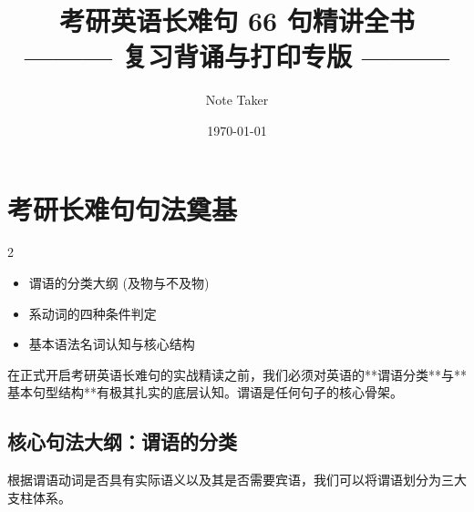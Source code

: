 \documentclass[cn,normal,11pt]{elegantnote}
\title{考研英语长难句 66 句精讲全书\\{\large ——— 复习背诵与打印专版 ———}}
\author{Note Taker}
\institute{一战成硕之句法拆解与核心词汇全攻略}
\date{\today}
\newcommand{\introductionname}{内容概要}
\newenvironment{introduction}[1][\introductionname]{
  \begin{tcolorbox}[introductionsty,title={#1}]
    \begin{multicols}{2}
      \begin{itemize}[label=\textcolor{structurecolor}{\SquareShadowBottomRight}]}{
      \end{itemize}
    \end{multicols}
  \end{tcolorbox}}
\begin{document}
\linespread{1.15}\selectfont
\setlength{\parskip}{1.5pt}

\maketitle


\tableofcontents



\section{考研长难句句法奠基}

\begin{introduction}
  \item 谓语的分类大纲 (及物与不及物)
  \item 系动词的四种条件判定
  \item 基本语法名词认知与核心结构
\end{introduction}

在正式开启考研英语长难句的实战精读之前，我们必须对英语的**谓语分类**与**基本句型结构**有极其扎实的底层认知。谓语是任何句子的核心骨架。

\subsection{核心句法大纲：谓语的分类}

根据谓语动词是否具有实际语义以及其是否需要宾语，我们可以将谓语划分为三大支柱体系。
\end{document}
